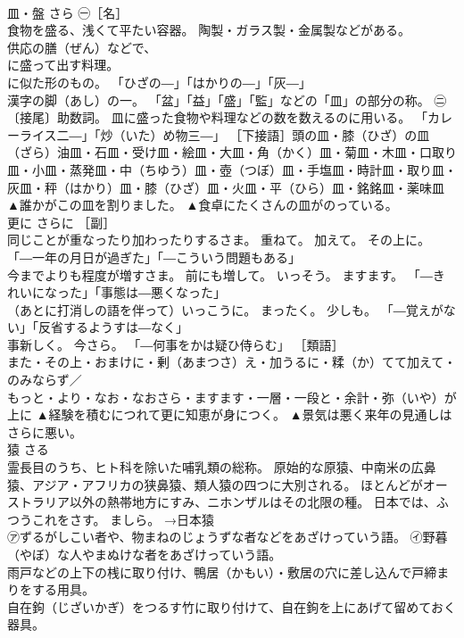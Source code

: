 \documentclass[8pt]{extreport}
\begin{document}
\begin{CJK}{UTF8}{min}
\\	皿・盤	さら	㊀［名］ 
\\	食物を盛る、浅くて平たい容器。 陶製・ガラス製・金属製などがある。 
\\	供応の膳（ぜん）などで、 
\\	に盛って出す料理。 
\\	に似た形のもの。 「ひざの―」「はかりの―」「灰―」 
\\	漢字の脚（あし）の一。 「盆」「益」「盛」「監」などの「皿」の部分の称。 ㊁〔接尾〕助数詞。 皿に盛った食物や料理などの数を数えるのに用いる。 「カレーライス二―」「炒（いた）め物三―」 ［下接語］頭の皿・膝（ひざ）の皿　（ざら）油皿・石皿・受け皿・絵皿・大皿・角（かく）皿・菊皿・木皿・口取り皿・小皿・蒸発皿・中（ちゆう）皿・壺（つぼ）皿・手塩皿・時計皿・取り皿・灰皿・秤（はかり）皿・膝（ひざ）皿・火皿・平（ひら）皿・銘銘皿・薬味皿	▲誰かがこの皿を割りました。 ▲食卓にたくさんの皿がのっている。
\\	更に	さらに	［副］ 
\\	同じことが重なったり加わったりするさま。 重ねて。 加えて。 その上に。 「―一年の月日が過ぎた」「―こういう問題もある」 
\\	今までよりも程度が増すさま。 前にも増して。 いっそう。 ますます。 「―きれいになった」「事態は―悪くなった」 
\\	（あとに打消しの語を伴って）いっこうに。 まったく。 少しも。 「―覚えがない」「反省するようすは―なく」 
\\	事新しく。 今さら。 「―何事をかは疑ひ侍らむ」 ［類語］
\\	また・その上・おまけに・剰（あまつさ）え・加うるに・糅（か）てて加えて・のみならず／
\\	もっと・より・なお・なおさら・ますます・一層・一段と・余計・弥（いや）が上に	▲経験を積むにつれて更に知恵が身につく。 ▲景気は悪く来年の見通しはさらに悪い。
\\	猿	さる	
\\	霊長目のうち、ヒト科を除いた哺乳類の総称。 原始的な原猿、中南米の広鼻猿、アジア・アフリカの狭鼻猿、類人猿の四つに大別される。 ほとんどがオーストラリア以外の熱帯地方にすみ、ニホンザルはその北限の種。 日本では、ふつうこれをさす。 ましら。 →日本猿 
\\	㋐ずるがしこい者や、物まねのじょうずな者などをあざけっていう語。 ㋑野暮（やぼ）な人やまぬけな者をあざけっていう語。 
\\	雨戸などの上下の桟に取り付け、鴨居（かもい）・敷居の穴に差し込んで戸締まりをする用具。 
\\	自在鉤（じざいかぎ）をつるす竹に取り付けて、自在鉤を上にあげて留めておく器具。 

\end{CJK}
\end{document}
